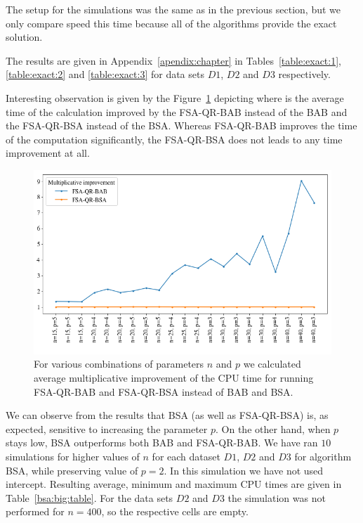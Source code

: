 The setup for the simulations was the same as in the previous section, but we only compare speed this time because all of the algorithms provide the exact solution. 

The results are given in Appendix~\ref{apendix:chapter} in Tables~\ref{table:exact:1}, \ref{table:exact:2} and \ref{table:exact:3} for data sets $D1$, $D2$ and $D3$ respectively. 
    
Interesting observation is given by the Figure~\ref{exact:improvement} depicting where is the average time of the calculation improved by the FSA-QR-BAB instead of the BAB and the FSA-QR-BSA instead of the BSA. Whereas FSA-QR-BAB improves the time of the computation significantly, the FSA-QR-BSA does not leads to any time improvement at all.
 
\begin{figure}[h]
    \centering
    \includegraphics[width=12cm]{img/exact_improvement}

    \caption{For various combinations of parameters $n$ and $p$ we calculated average multiplicative improvement of the CPU time for running FSA-QR-BAB and FSA-QR-BSA instead of BAB and BSA.}
    \label{exact:improvement}

    
\end{figure}

We can observe from the results that BSA (as well as FSA-QR-BSA) is, as expected, sensitive to increasing the parameter $p$. On the other hand, when $p$ stays low, BSA outperforms both BAB and FSA-QR-BAB. We have ran $10$ simulations for higher values of $n$ for each dataset $D1$, $D2$ and $D3$ for algorithm BSA, while preserving value of $p = 2$. In this simulation we have not used intercept. Resulting average, minimum and maximum CPU times are given in Table~\ref{bsa:big:table}. For the data sets $D2$ and $D3$ the simulation was not performed for $n = 400$, so the 
respective cells are empty.



